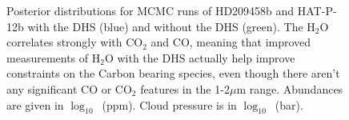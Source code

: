 \documentclass[iop]{emulateapj}
\begin{document}
\begin{figure}[t]
\centering
{}
	\caption{Posterior distributions for MCMC runs of HD209458b and HAT-P-12b with the DHS (blue) and without the DHS (green). The H$_2$O correlates strongly with CO$_2$ and CO, meaning that improved measurements of H$_2$O with the DHS actually help improve constraints on the Carbon bearing species, even though there aren't any significant CO or CO$_2$ features in the 1-2$\mu$m range. Abundances are given in $\log_{10}$~(ppm). Cloud pressure is in $\log_{10}$~(bar).}
	\label{fig:corner}
\end{figure} 
\end{document}
